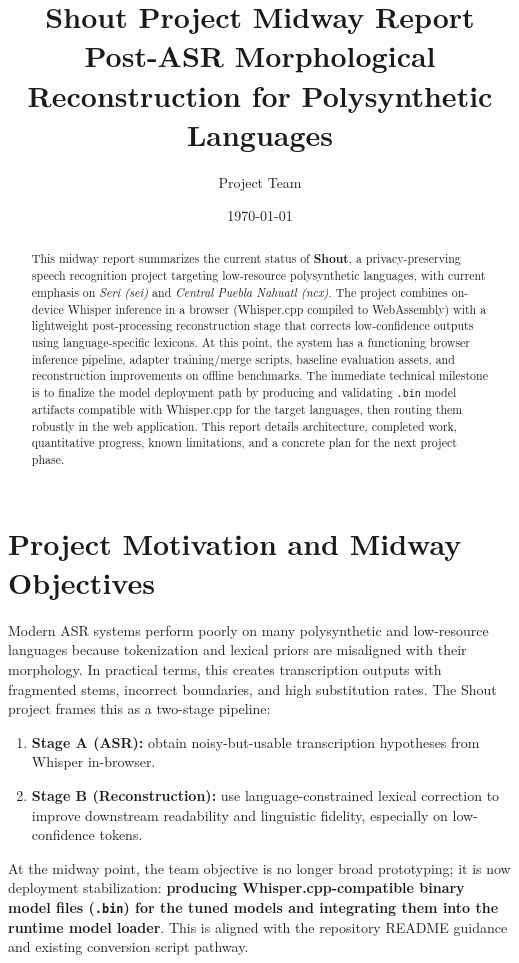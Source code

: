 \documentclass[11pt]{article}
\title{Shout Project Midway Report\\\large Post-ASR Morphological Reconstruction for Polysynthetic Languages}
\author{Project Team}
\date{\today}
\begin{document}
\maketitle
\thispagestyle{empty}

\begin{abstract}
This midway report summarizes the current status of \textbf{Shout}, a privacy-preserving speech recognition project targeting low-resource polysynthetic languages, with current emphasis on \textit{Seri (sei)} and \textit{Central Puebla Nahuatl (ncx)}. The project combines on-device Whisper inference in a browser (Whisper.cpp compiled to WebAssembly) with a lightweight post-processing reconstruction stage that corrects low-confidence outputs using language-specific lexicons. At this point, the system has a functioning browser inference pipeline, adapter training/merge scripts, baseline evaluation assets, and reconstruction improvements on offline benchmarks. The immediate technical milestone is to finalize the model deployment path by producing and validating \texttt{.bin} model artifacts compatible with Whisper.cpp for the target languages, then routing them robustly in the web application. This report details architecture, completed work, quantitative progress, known limitations, and a concrete plan for the next project phase.
\end{abstract}

\newpage

\section{Project Motivation and Midway Objectives}
Modern ASR systems perform poorly on many polysynthetic and low-resource languages because tokenization and lexical priors are misaligned with their morphology. In practical terms, this creates transcription outputs with fragmented stems, incorrect boundaries, and high substitution rates. The Shout project frames this as a two-stage pipeline:
\begin{enumerate}[leftmargin=1.3em]
    \item \textbf{Stage A (ASR):} obtain noisy-but-usable transcription hypotheses from Whisper in-browser.
    \item \textbf{Stage B (Reconstruction):} use language-constrained lexical correction to improve downstream readability and linguistic fidelity, especially on low-confidence tokens.
\end{enumerate}

At the midway point, the team objective is no longer broad prototyping; it is now deployment stabilization: \textbf{producing Whisper.cpp-compatible binary model files (\texttt{.bin}) for the tuned models and integrating them into the runtime model loader}. This is aligned with the repository README guidance and existing conversion script pathway.
\end{document}
